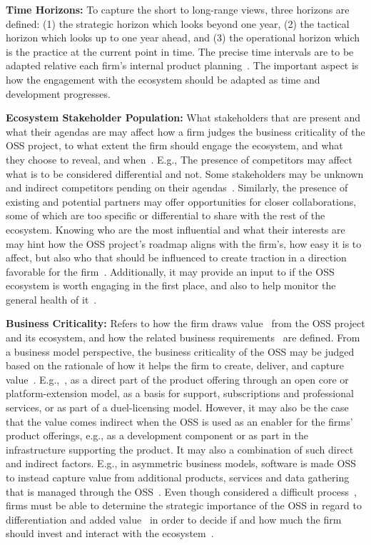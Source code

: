 \documentclass[a4paper]{llncs}
\begin{document}
\noindent\textbf{Time Horizons:} To capture the short to long-range views, three horizons are defined: (1) the strategic horizon which looks beyond one year, (2) the tactical horizon which looks up to one year ahead, and (3) the operational horizon which is the practice at the current point in time. The precise time intervals are to be adapted relative each firm's internal product planning~\cite{fricker2012software}. The important aspect is how the engagement with the ecosystem should be adapted as time and development progresses.

\noindent\textbf{Ecosystem Stakeholder Population:} What stakeholders that are present and what their agendas are may affect how a firm judges the business criticality of the OSS project, to what extent the firm should engage the ecosystem, and what they choose to reveal, and when~\cite{munir2015open}. E.g., The presence of competitors may affect what is to be considered differential and not. Some stakeholders may be unknown and indirect competitors pending on their agendas~\cite{van2009commodification}. Similarly, the presence of existing and potential partners may offer opportunities for closer collaborations, some of which are too specific or differential to share with the rest of the ecosystem. Knowing who are the most influential and what their interests are may hint how the OSS project's roadmap aligns with the firm’s, how easy it is to affect, but also who that should be influenced to create traction in a direction favorable for the firm~\cite{linaaker2016firms}. Additionally, it may provide an input to if the OSS ecosystem is worth engaging in the first place, and also to help monitor the general health of it~\cite{jansen2009business}.

\noindent\textbf{Business Criticality:} Refers to how the firm draws value~\cite{Aurum2007} from the OSS project and its ecosystem, and how the related business requirements~\cite{wiegers2013software} are defined. From a business model perspective, the business criticality of the OSS may be judged based on the rationale of how it helps the firm to create, deliver, and capture value~\cite{osterwalder2010business}. E.g.,~\cite{chesbrough2007open, west2003open}, as a direct part of the product offering through an open core or platform-extension model, as a basis for support, subscriptions and professional services, or as part of a duel-licensing model. However, it may also be the case that the value comes indirect when the OSS is used as an enabler for the firms’ product offerings, e.g., as a development component or as part in the infrastructure supporting the product. It may also a combination of such direct and indirect factors. E.g., in asymmetric business models, software is made OSS to instead capture value from additional products, services and data gathering that is managed through the OSS~\cite{visionmobile2014assymetric}. Even though considered a difficult process~\cite{Komssi2015}, firms must be able to determine the strategic importance of the OSS in regard to differentiation and added value~\cite{Aurum2007} in order to decide if and how much the firm should invest and interact with the ecosystem~\cite{wnuk2012can}. 
\end{document}
